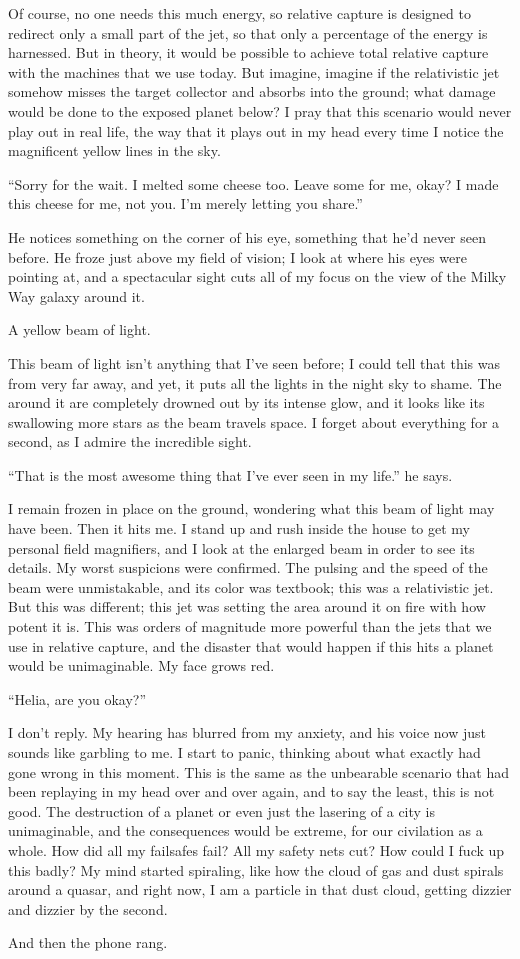 \documentclass{book}
\begin{document}
			Of course, no one needs this much energy, so relative capture is designed to redirect
			only a small part of the jet, so that only a percentage of the energy is harnessed.
			But in theory, it would be possible to achieve total relative capture with the machines
			that we use today. But imagine, imagine if the relativistic jet somehow misses the
			target collector and absorbs into the ground; what damage would be done to the exposed
			planet below? I pray that this scenario would never play out in real life, the way that
			it plays out in my head every time I notice the magnificent yellow lines in the sky.

			``Sorry for the wait. I melted some cheese too. Leave some for me, okay? I made this
			cheese for me, not you. I'm merely letting you share.''

			He notices something on the corner of his eye, something that he'd never seen before.
			He froze just above my field of vision; I look at where his eyes were pointing at, and
			a spectacular sight cuts all of my focus on the view of the Milky Way galaxy around it.

			A yellow beam of light.

			This beam of light isn't anything that I've seen before; I could tell that this was from
			very far away, and yet, it puts all the lights in the night sky to shame. The around it
			are completely drowned out by its intense glow, and it looks like its swallowing more
			stars as the beam travels space. I forget about everything for a second, as I admire the
			incredible sight.

			``That is the most awesome thing that I've ever seen in my life.'' he says.

			I remain frozen in place on the ground, wondering what this beam of light may have been.
			Then it hits me. I stand up and rush inside the house to get my personal field magnifiers,
			and I look at the enlarged beam in order to see its details. My worst suspicions were
			confirmed. The pulsing and the speed of the beam were unmistakable, and its color was
			textbook; this was a relativistic jet. But this was different; this jet was setting the
			area around it on fire with how potent it is. This was orders of magnitude more powerful
			than the jets that we use in relative capture, and the disaster that would happen if this
			hits a planet would be unimaginable. My face grows red.

			``Helia, are you okay?''

			I don't reply. My hearing has blurred from my anxiety, and his voice now just sounds like
			garbling to me. I start to panic, thinking about what exactly had gone wrong in this moment.
			This is the same as the unbearable scenario that had been replaying in my head over and over again,
			and to say the least, this is not good. The destruction of a planet or even just the lasering of a
			city is unimaginable, and the consequences would be extreme, for our civilation as a whole. How
			did all my failsafes fail? All my safety nets cut? How could I fuck up this badly? My mind
			started spiraling, like how the cloud of gas and dust spirals around a quasar, and right now, I am
			a particle in that dust cloud, getting dizzier and dizzier by the second.

			And then the phone rang.
\end{document}
